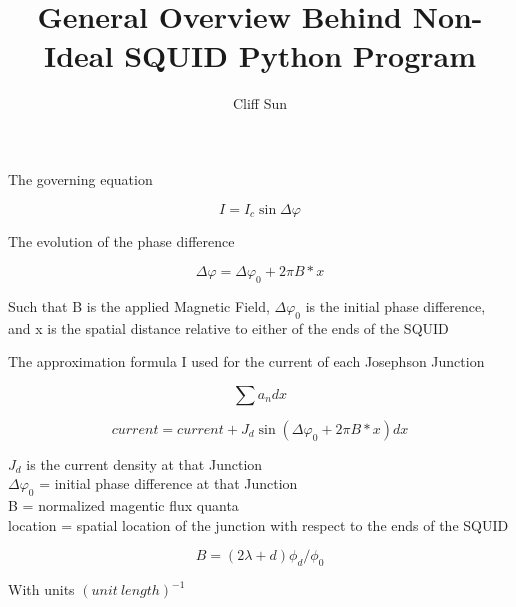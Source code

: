\documentclass[12pt]{article}
\author{Cliff Sun}
\title{General Overview Behind Non-Ideal SQUID Python Program}
\begin{document}
\maketitle

\begin{center} The governing equation \end{center}

\begin{equation}
    I = I_{c} \sin \Delta \varphi
\end{equation}

\begin{center} The evolution of the phase difference \end{center}

\begin{equation}
\Delta \varphi = \Delta\varphi_{0} + 2 \pi B*x
\end{equation}

\begin{center} Such that B is the applied Magnetic Field, \(\Delta\varphi_{0}\) is the initial phase difference, 
and x is the spatial distance relative to either of the ends of the SQUID \end{center}

\begin{center} The approximation formula I used for the current of each Josephson Junction \end{center}
\begin{equation}
\sum a_{n}dx    
\end{equation}

\begin{equation}
current = current + J_d \sin (\Delta\varphi_0 + 2 \pi B*x)dx
\end{equation}

\begin{center}
    \(J_d\) is the current density at that Junction \\
    \(\Delta\varphi_0\) = initial phase difference at that Junction \\
    B = normalized magentic flux quanta \\
    location = spatial location of the junction with respect to the ends of the SQUID
\end{center}

\begin{equation}
B = (2\lambda + d) \phi_d / \phi_0
\end{equation}

\begin{center} With units \((unit\:length)^{-1}\) \end{center}
\end{document}
